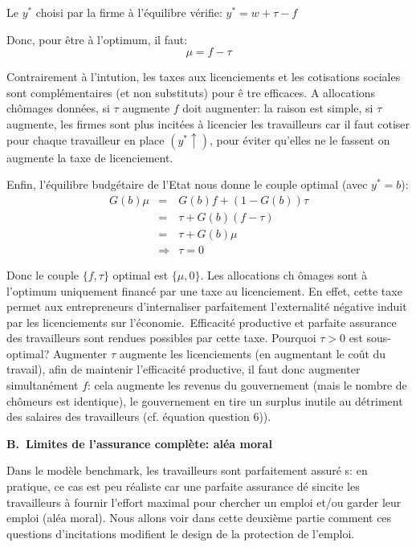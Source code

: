 \documentclass[a4paper]{article}
\begin{document}
\bigskip

Le $y^{\ast }$ choisi par la firme \`{a} l'\'{e}quilibre v\'{e}rifie: $%
y^{\ast }=w+\tau -f$

Donc, pour \^{e}tre \`{a} l'optimum, il faut:%
\begin{equation*}
\mu =f-\tau
\end{equation*}

Contrairement \`{a} l'intution, les taxes aux licenciements et les
cotisations sociales sont compl\'{e}mentaires (et non substituts) pour \^{e}%
tre efficaces. A allocations ch\^{o}mages donn\'{e}es, si $\tau $ augmente $%
f $ doit augmenter: la raison est simple, si $\tau $ augmente, les firmes
sont plus incit\'{e}es \`{a} licencier les travailleurs car il faut cotiser
pour chaque travailleur en place $(y^{\ast }\uparrow )$, pour \'{e}viter
qu'elles ne le fassent on augmente la taxe de licenciement.

\bigskip

Enfin, l'\'{e}quilibre budg\'{e}taire de l'Etat nous donne le couple optimal
(avec $y^{\ast }=b$):%
\begin{eqnarray*}
G(b)\mu &=&G(b)f+\left( 1-G(b)\right) \tau \\
&=&\tau +G(b)\left( f-\tau \right) \\
&=&\tau +G(b)\mu \\
&\Rightarrow &\tau =0
\end{eqnarray*}

Donc le couple $\{f,\tau \}$ optimal est $\{\mu ,0\}$. Les allocations ch%
\^{o}mages sont \`{a} l'optimum uniquement financ\'{e} par une taxe au
licenciement. En effet, cette taxe permet aux entrepreneurs d'internaliser
parfaitement l'externalit\'{e} n\'{e}gative induit par les licenciements sur
l'\'{e}conomie.\ Efficacit\'{e} productive et parfaite assurance des
travailleurs sont rendues possibles par cette taxe. Pourquoi $\tau >0$ est
sous-optimal? Augmenter $\tau $ augmente les licenciements (en augmentant le
co\^{u}t du travail), afin de maintenir l'efficacit\'{e} productive, il faut
donc augmenter simultan\'{e}ment $f$: cela augmente les revenus du
gouvernement (mais le nombre de ch\^{o}meurs est identique), le gouvernement
en tire un surplus inutile au d\'{e}triment des salaires des travailleurs
(cf. \'{e}quation question 6)).

\bigskip

\textbf{B.\ Limites de l'assurance compl\`{e}te: al\'{e}a moral}

\bigskip

Dans le mod\`{e}le benchmark, les travailleurs sont parfaitement assur\'{e}%
s: en pratique, ce cas est peu r\'{e}aliste car une parfaite assurance d\'{e}%
sincite les travailleurs \`{a} fournir l'effort maximal pour chercher un
emploi et/ou garder leur emploi (al\'{e}a moral). Nous allons voir dans
cette deuxi\`{e}me partie comment ces questions d'incitations modifient le
design de la protection de l'emploi.
\end{document}
